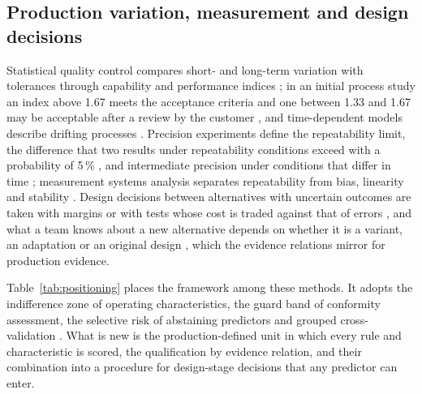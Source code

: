 \documentclass[pdflatex,sn-basic,lineno]{sn-jnl}
\begin{document}
\subsection{Production variation, measurement and design decisions}

Statistical quality control compares short- and long-term variation with tolerances through capability and performance indices \citep{montgomery2019introduction}; in an initial process study an index above 1.67 meets the acceptance criteria and one between 1.33 and 1.67 may be acceptable after a review by the customer \citep{aiag2006production}, and time-dependent models describe drifting processes \citep{iso2026process}. Precision experiments define the repeatability limit, the difference that two results under repeatability conditions exceed with a probability of 5\,\% \citep{iso2025repeatability}, and intermediate precision under conditions that differ in time \citep{iso2023intermediate}; measurement systems analysis separates repeatability from bias, linearity and stability \citep{aiag2010measurement}. Design decisions between alternatives with uncertain outcomes \citep{hazelrigg1998framework} are taken with margins \citep{eckert2019design} or with tests whose cost is traded against that of errors \citep{thomke2001sequential, salado2018mathematical}, and what a team knows about a new alternative depends on whether it is a variant, an adaptation or an original design \citep{pahl2007engineering}, which the evidence relations mirror for production evidence.

Table~\ref{tab:positioning} places the framework among these methods. It adopts the indifference zone of operating characteristics, the guard band of conformity assessment, the selective risk of abstaining predictors and grouped cross-validation \citep{roberts2017cross}. What is new is the production-defined unit in which every rule and characteristic is scored, the qualification by evidence relation, and their combination into a procedure for design-stage decisions that any predictor can enter.
\end{document}
